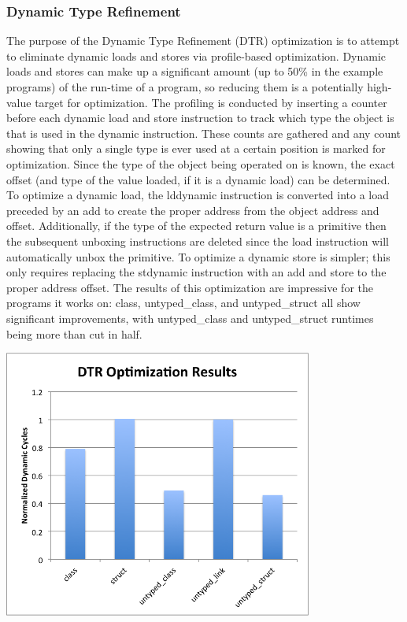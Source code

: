 \documentclass[12pt,letterpaper]{article}
\begin{document}
\subsubsection*{Dynamic Type Refinement}
The purpose of the Dynamic Type Refinement (DTR) optimization is to
attempt to eliminate dynamic loads and stores via profile-based
optimization. Dynamic loads and stores can make up a significant
amount (up to 50\% in the example programs) of the run-time of a
program, so reducing them is a potentially high-value target for
optimization.
The profiling is conducted by inserting a counter before
each dynamic load and store instruction to track which type the
object is that is used in the dynamic instruction. These counts are
gathered and any count showing that only a single type is ever used at
a certain position is marked for optimization. Since the type of the
object being operated on is known, the exact offset (and type of the
value loaded, if it is a dynamic load) can be determined. 
To optimize a dynamic load, the lddynamic instruction is converted
into a load preceded by an add to create the proper address from the
object address and offset. Additionally, if the type of the expected
return value is a primitive then the subsequent unboxing instructions
are deleted since the load instruction will automatically unbox the
primitive.
To optimize a dynamic store is simpler; this only requires replacing
the stdynamic instruction with an add and store to the proper address
offset.
The results of this optimization are impressive for the programs it
works on: class, untyped\_class, and untyped\_struct all show
significant improvements, with untyped\_class and untyped\_struct
runtimes being more than cut in half. 
\begin{center}
\includegraphics[width=4in]{dtrstats.png}
\end{center}
\end{document}
